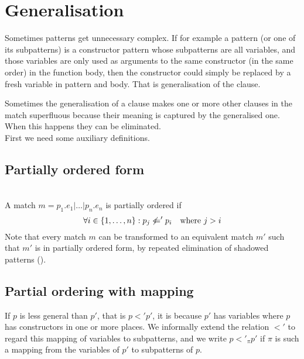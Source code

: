 


\section{Generalisation}\label{sec:generalisiation}
Sometimes patterns get unnecessary complex. If for example a pattern (or one of
its subpatterns) is a constructor pattern whose subpatterns are all variables,
and those variables are only used as arguments to the same constructor (in the
same order) in the function body, then the constructor could simply be replaced
by a fresh variable in pattern and body. That is generalisation of the clause.

Sometimes the generalisation of a clause makes one or more other clauses in the
match superfluous because their meaning is captured by the generalised one. When
this happens they can be eliminated.
\\[1em]
First we need some auxiliary definitions.

\subsection{Partially ordered form}
\begin{definition}\
  \label{def:part-order-form}\\
  A match $m = p_1\texttt{.}e_1\texttt{|}\ldots\texttt{|}p_n\texttt{.}e_n$ is
  partially ordered if
  \[
  \forall i \in \{1, \ldots, n\} : p_j \not <=' p_i \quad \textnormal{where $j > i$}
  \]
  Note that every match $m$ can be transformed to an equivalent match $m'$ such
  that $m'$ is in partially ordered form, by repeated elimination of shadowed
  patterns (\fref{sec:shadowed-patterns}).
\end{definition}

\subsection{Partial ordering with mapping}
If $p$ is less general than $p'$, that is $p <' p'$, it is because $p'$ has
variables where $p$ has constructors in one or more places. We informally extend
the relation $<'$ to regard this mapping of variables to subpatterns, and we
write $p <'_\pi p'$ if $\pi$ is such a mapping from the variables of $p'$ to
subpatterns of $p$.

